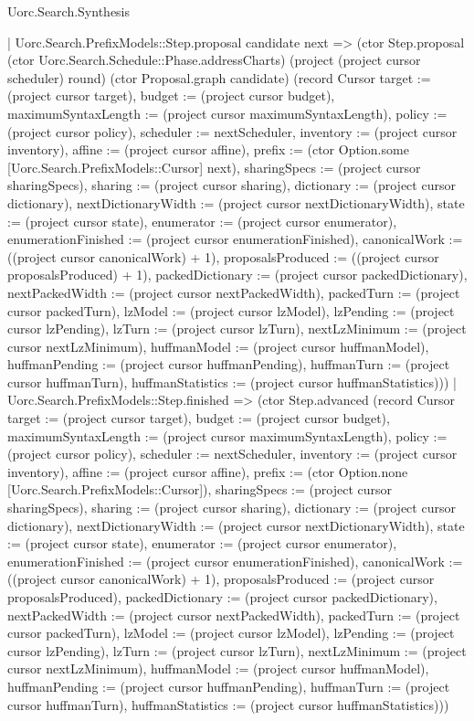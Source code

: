 \begin{lexlean}{Uorc.Search.Synthesis}
\begin{semanticmodule}
{          | Uorc.Search.PrefixModels::Step.proposal candidate next => (ctor Step.proposal (ctor Uorc.Search.Schedule::Phase.addressCharts) (project (project cursor scheduler) round) (ctor Proposal.graph candidate) (record Cursor {target := (project cursor target), budget := (project cursor budget), maximumSyntaxLength := (project cursor maximumSyntaxLength), policy := (project cursor policy), scheduler := nextScheduler, inventory := (project cursor inventory), affine := (project cursor affine), prefix := (ctor Option.some [Uorc.Search.PrefixModels::Cursor] next), sharingSpecs := (project cursor sharingSpecs), sharing := (project cursor sharing), dictionary := (project cursor dictionary), nextDictionaryWidth := (project cursor nextDictionaryWidth), state := (project cursor state), enumerator := (project cursor enumerator), enumerationFinished := (project cursor enumerationFinished), canonicalWork := ((project cursor canonicalWork) + 1), proposalsProduced := ((project cursor proposalsProduced) + 1), packedDictionary := (project cursor packedDictionary), nextPackedWidth := (project cursor nextPackedWidth), packedTurn := (project cursor packedTurn), lzModel := (project cursor lzModel), lzPending := (project cursor lzPending), lzTurn := (project cursor lzTurn), nextLzMinimum := (project cursor nextLzMinimum), huffmanModel := (project cursor huffmanModel), huffmanPending := (project cursor huffmanPending), huffmanTurn := (project cursor huffmanTurn), huffmanStatistics := (project cursor huffmanStatistics)}))
          | Uorc.Search.PrefixModels::Step.finished => (ctor Step.advanced (record Cursor {target := (project cursor target), budget := (project cursor budget), maximumSyntaxLength := (project cursor maximumSyntaxLength), policy := (project cursor policy), scheduler := nextScheduler, inventory := (project cursor inventory), affine := (project cursor affine), prefix := (ctor Option.none [Uorc.Search.PrefixModels::Cursor]), sharingSpecs := (project cursor sharingSpecs), sharing := (project cursor sharing), dictionary := (project cursor dictionary), nextDictionaryWidth := (project cursor nextDictionaryWidth), state := (project cursor state), enumerator := (project cursor enumerator), enumerationFinished := (project cursor enumerationFinished), canonicalWork := ((project cursor canonicalWork) + 1), proposalsProduced := (project cursor proposalsProduced), packedDictionary := (project cursor packedDictionary), nextPackedWidth := (project cursor nextPackedWidth), packedTurn := (project cursor packedTurn), lzModel := (project cursor lzModel), lzPending := (project cursor lzPending), lzTurn := (project cursor lzTurn), nextLzMinimum := (project cursor nextLzMinimum), huffmanModel := (project cursor huffmanModel), huffmanPending := (project cursor huffmanPending), huffmanTurn := (project cursor huffmanTurn), huffmanStatistics := (project cursor huffmanStatistics)}))
}
\end{semanticmodule}
\end{lexlean}
